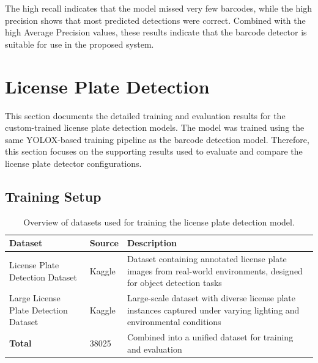The high recall indicates that the model missed very few barcodes, while the
high precision shows that most predicted detections were correct. Combined with
the high Average Precision values, these results indicate that the barcode
detector is suitable for use in the proposed system.








\section{License Plate Detection}
\label{app:license_plate_results}

This section documents the detailed training and evaluation results for the
custom-trained license plate detection models. The model was trained using the
same YOLOX-based training pipeline as the barcode detection model. Therefore,
this section focuses on the supporting results used to evaluate and compare the
license plate detector configurations.


\subsection{Training Setup}

\begin{table}[H]
\centering
\begin{tabular}{l l p{5.0cm}}
\toprule
\textbf{Dataset} & \textbf{Source} & \textbf{Description} \\
\midrule
License Plate Detection Dataset
& Kaggle \cite{lp_dataset_1} 
& Dataset containing annotated license plate images from real-world environments, designed for object detection tasks \\

Large License Plate Detection Dataset
& Kaggle \cite{lp_dataset_2} 
& Large-scale dataset with diverse license plate instances captured under varying lighting and environmental conditions \\

\midrule
\textbf{Total} & 38025 & Combined into a unified dataset for training and evaluation \\
\bottomrule
\end{tabular}
\caption{Overview of datasets used for training the license plate detection model.}
\label{tab:licenseplate_datasets}
\end{table}



